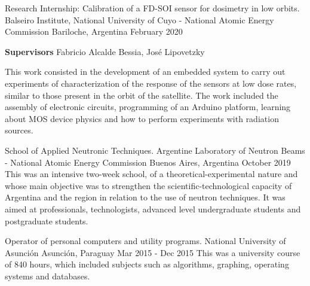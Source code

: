 \begin{cventries}
  \cventry
    {Research Internship: Calibration of a FD-SOI sensor for dosimetry in low orbits.} %
    {Balseiro Institute, National University of Cuyo - National Atomic Energy Commission} %
    {Bariloche, Argentina} %
    {February 2020} %
    {
      \begin{cvitems} %
        \item {\textbf{Supervisors} Fabricio Alcalde Bessia, José Lipovetzky}
        \item {This work consisted in the development of an embedded system to carry out experiments of characterization of the response of the sensors at low dose rates, similar to those present in the orbit of the satellite. The work included the assembly of electronic circuits, programming of an Arduino platform, learning about MOS device physics and how to perform experiments with radiation sources.}
      \end{cvitems}
    }
    
  \cventry
    {School of Applied Neutronic Techniques.} %
    {Argentine Laboratory of Neutron Beams - National Atomic Energy Commission} %
    {Buenos Aires, Argentina} %
    {October 2019} %
    {This was an intensive two-week school, of a theoretical-experimental nature and whose main objective was to strengthen the scientific-technological capacity of Argentina and the region in relation to the use of neutron techniques. It was aimed at professionals, technologists, advanced level undergraduate students and postgraduate students.}
        
  \cventry
    {Operator of personal computers and utility programs.} %
    {National University of Asunción} %
    {Asunción, Paraguay} %
    {Mar 2015 - Dec 2015} %
    {This was a university course of 840 hours, which included subjects such as algorithms, graphing, operating systems and databases.}
    
\end{cventries}
